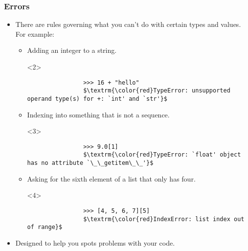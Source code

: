 \documentclass[notes]{beamer}
\begin{document}
\begin{frame}[fragile]
	\frametitle{Errors}
	
	\begin{itemize}
		\item There are rules governing what you can't do with certain types and values.
		\pause For example:
		\begin{itemize}
			\item Adding an integer to a string.
			\begin{onlyenv}<2>
				\begin{lstlisting}
				>>> 16 + "hello"
				$\textrm{\color{red}TypeError: unsupported operand type(s) for +: `int' and `str'}$
				\end{lstlisting}
			\end{onlyenv}
			
			\pause
			
			\item Indexing into something that is not a sequence.
			\begin{onlyenv}<3>
				\begin{lstlisting}
				>>> 9.0[1]
				$\textrm{\color{red}TypeError: `float' object has no attribute `\_\_getitem\_\_'}$
				\end{lstlisting}
			\end{onlyenv}
			
			\pause
			
			\item Asking for the sixth element of a list that only has four.
			\begin{onlyenv}<4>
				\begin{lstlisting}
				>>> [4, 5, 6, 7][5]
				$\textrm{\color{red}IndexError: list index out of range}$
				\end{lstlisting}
			\end{onlyenv}
			
			\pause
		\end{itemize}
		\item Designed to help you spots problems with your code.
	\end{itemize}
\end{frame}
\end{document}
